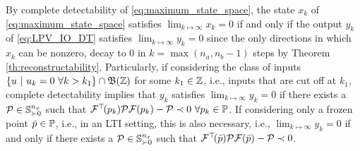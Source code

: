 \begin{remark}
    By complete detectability of \eqref{eq:maximum_state_space}, the state $x_k$ of \eqref{eq:maximum_state_space} satisfies $\lim_{k\mapsto \infty} x_k = 0$ if and only if the output $y_k$ of \eqref{eq:LPV_IO_DT} satisfies $\lim_{k\mapsto \infty} y_k = 0$ since the only directions in which $x_k$ can be nonzero, decay to $0$ in $k=\max(n_a,n_b-1)$ steps by Theorem \ref{th:reconstructability}. Particularly, if considering the class of inputs $\{u \ | \ u_k = 0 \ \forall k > k_1 \} \cap \mathfrak{B}(\mathbb{Z})$ for some $k_1 \in \mathbb{Z}$, i.e., inputs that are cut off at $k_1$, complete detectability implies that $y_k$ satisfies $\lim_{k\mapsto \infty} y_k = 0$ if there exists a $\mathcal{P} \in \mathbb{S}_{\succ 0}^{n_x}$ such that $\mathcal{F}^\top\!(p_k) \mathcal{P} \mathcal{F}(p_k) - \mathcal{P} \prec 0 \ \forall p_k\in\mathbb{P}$. If considering only a frozen point $\bar{p}\in\mathbb{P}$, i.e., in an LTI setting, this is also necessary, i.e., $\lim_{k\mapsto \infty} y_k = 0$ if and only if there exists a $\mathcal{P} \in \mathbb{S}_{\succ 0}^{n_x}$ such that $\mathcal{F}^\top\!(\bar{p}) \mathcal{P} \mathcal{F}(\bar{p}) - \mathcal{P} \prec 0$.
\end{remark}

